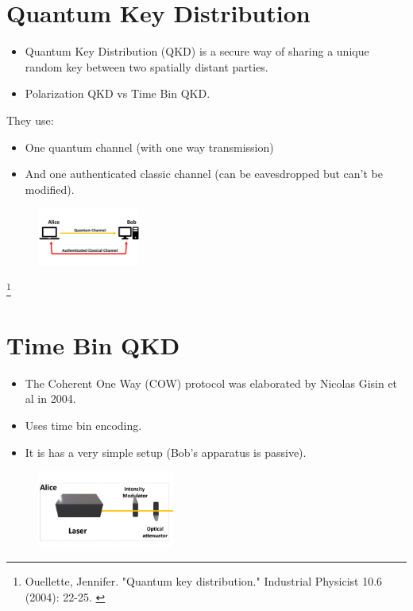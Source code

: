 \documentclass[1000pt]{article}
\newcommand{\mysection}[1]{\section*{\color{black}\sffamily #1}}%
\newcommand{\cref}[1]{{\fontsize{17pt}{0cm}\selectfont\color{black} #1}}%
\newcommand\blfootnote[1]{%
  \begingroup
  \renewcommand\thefootnote{}\footnote{#1}%
  \addtocounter{footnote}{-1}%
  \endgroup
}
\begin{document}
\mysection{\Huge\textbf{ Quantum Key Distribution}} \Large \vspace*{1cm}
\begin{itemize}
\item Quantum Key Distribution (QKD) is a secure way of sharing a unique random key between two spatially distant parties. 
\item Polarization QKD vs Time Bin QKD.
\end{itemize}
They use:
\begin{itemize}
\item One quantum channel (with one way transmission)
\item And one authenticated classic channel (can be eavesdropped but can't be modified).
\end{itemize}
  \begin{figure}[hbt]
    	\centering
    	\includegraphics[width=0.3\textwidth]{./figures/Full.pdf}
    \end{figure}
    
    
\blfootnote{
\hspace*{12cm}
\begin{minipage}{26cm}
\cref{
Ouellette, Jennifer. "Quantum key distribution." Industrial Physicist 10.6 (2004): 22-25.
}
\end{minipage}

}
\mysection{\Huge\textbf{Time Bin QKD}} \Large \vspace*{1cm}
\begin{itemize}

\item The Coherent One Way (COW) protocol was elaborated by Nicolas Gisin et al in 2004. 

\item Uses time bin encoding.

\item It is has a very simple setup (Bob's apparatus is passive).
\end{itemize}
    \begin{figure}[hbt]
    	\centering
    	\includegraphics[width=0.4\textwidth]{./figures/A.pdf}
        	\label{bob}
    \end{figure}
    
\end{document}
